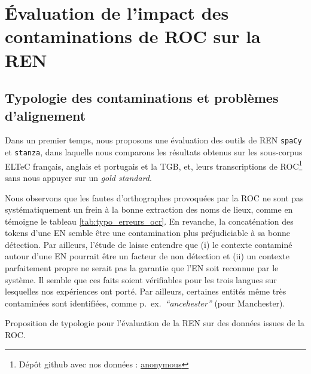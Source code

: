 
\section{Évaluation de l'impact des contaminations de ROC sur la REN} 
\label{subsec:OCR-IMPACT-NER}
\subsection{Typologie des contaminations et problèmes d'alignement}



Dans un premier temps, nous proposons une évaluation des outils de REN \texttt{spaCy} et \texttt{stanza}, dans laquelle nous comparons les résultats obtenus sur les sous-corpus ELTeC français, anglais et portugais et la TGB, et, leurs transcriptions de ROC\footnote{Dépôt github avec nos données : \url{anonymous}} sans nous appuyer sur un \textit{gold standard}.

Nous observons que les fautes d'orthographes provoquées par la ROC ne sont pas systématiquement un frein à la bonne extraction des noms de lieux, comme en témoigne le tableau \ref{tab:typo_erreurs_ocr}. En revanche, la concaténation des tokens d'une EN semble être une contamination plus préjudiciable à sa bonne détection. Par ailleurs, l'étude de \cite{DBLP:conf/gis/Koudoro-Parfait21} laisse entendre que (i) le contexte contaminé autour d'une EN pourrait être un facteur de non détection et (ii) un contexte parfaitement propre ne serait pas la garantie que l'EN soit reconnue par le système. Il semble que ces faits soient vérifiables pour les trois langues sur lesquelles nos expériences ont porté. Par ailleurs, certaines entités même très contaminées sont identifiées, comme p.\ ex.\  \textit{``ancehester''} (pour \og{}Manchester\fg{}). 

\begin{table}[h!]
\small
    \centering
   
    \caption{Proposition de typologie pour l'évaluation de la REN sur des données issues de la ROC.}
    \label{tab:typo_erreurs_ocr}
\end{table}


